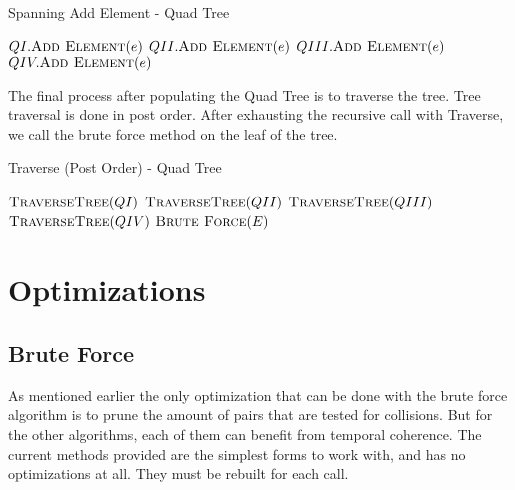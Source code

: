 \documentclass[conference]{IEEEtran}
\begin{document}
\begin{algorithm}
\caption{Spanning Add Element - Quad Tree}
\begin{algorithmic}[1]
                \State $QI.\Call{Add Element}{e}$
        \EndIf
                \State $QII.\Call{Add Element}{e}$
        \EndIf
                \State $QIII.\Call{Add Element}{e}$
        \EndIf
                \State $QIV.\Call{Add Element}{e}$
        \EndIf
\EndFunction
\end{algorithmic}
\end{algorithm}

The final process after populating the Quad Tree is to traverse the tree. Tree traversal is done in post order. After exhausting the recursive call with Traverse, we call the brute force method on the leaf of the tree.

\begin{algorithm}
\caption{Traverse (Post Order) - Quad Tree}
\begin{algorithmic}[1]
                \State $\Call{TraverseTree}{QI}$
        \EndIf
                \State $\Call{TraverseTree}{QII}$
        \EndIf
                \State $\Call{TraverseTree}{QIII}$
        \EndIf
                \State $\Call{TraverseTree}{QIV}$
        \EndIf
        \State $\Call{Brute Force}{E}$
\EndFunction
\end{algorithmic}
\end{algorithm}

\section{Optimizations}

\subsection{Brute Force}

As mentioned earlier the only optimization that can be done with the brute force algorithm is to prune the amount of pairs that are tested for collisions. But for the other algorithms, each of them can benefit from temporal coherence. The current methods provided are the simplest forms to work with, and has no optimizations at all. They must be rebuilt for each call.
\end{document}
